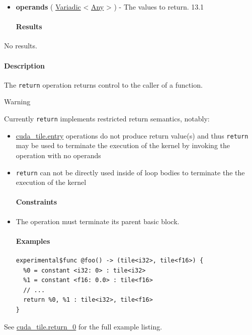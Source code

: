 \documentclass{article}
\begin{document}
\begin{itemize}
\item \textbf{operands} ( \href{https://docs.nvidia.com/cuda/tile-ir/latest/sections/operations.html#type-variadic}{Variadic} < \href{https://docs.nvidia.com/cuda/tile-ir/latest/sections/operations.html#type-any}{Any} > ) - The values to return. 13.1


\paragraph{Results}

\end{itemize}
No results.



\paragraph{Description}

The \texttt{return} operation returns control to the caller of a function.


Warning


Currently \texttt{return} implements restricted return semantics, notably:


\begin{itemize}
\item \href{https://docs.nvidia.com/cuda/tile-ir/latest/sections/operations.html#op-cuda-tile-entry}{cuda\_tile.entry} operations do not produce return value(s) and thus \texttt{return} may be used to terminate the execution of the kernel by invoking the operation with no operands
\item \texttt{return} can not be directly used inside of loop bodies to terminate the the execution of the kernel


\paragraph{Constraints}

\item The operation must terminate its parent basic block.


\paragraph{Examples}

\begin{lstlisting}
experimental$func @foo() -> (tile<i32>, tile<f16>) {
  %0 = constant <i32: 0> : tile<i32>
  %1 = constant <f16: 0.0> : tile<f16>
  // ...
  return %0, %1 : tile<i32>, tile<f16>
}
\end{lstlisting}

\end{itemize}
See \href{https://docs.nvidia.com/cuda/tile-ir/latest/sections/appendix.html#example-cuda-tile-return-0}{cuda\_tile.return\_0} for the full example listing.
\end{document}
